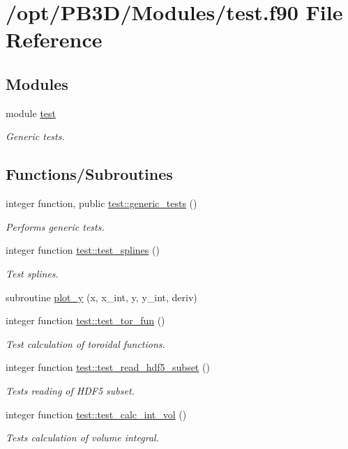 \hypertarget{test_8f90}{}\section{/opt/\+P\+B3\+D/\+Modules/test.f90 File Reference}
\label{test_8f90}
\subsection*{Modules}
\begin{DoxyCompactItemize}
\item 
module \hyperlink{namespacetest}{test}
\begin{DoxyCompactList}\small\item\em Generic tests. \end{DoxyCompactList}\end{DoxyCompactItemize}
\subsection*{Functions/\+Subroutines}
\begin{DoxyCompactItemize}
\item 
integer function, public \hyperlink{namespacetest_aca21ee464c0b1f4b617177afdde110ec}{test\+::generic\+\_\+tests} ()
\begin{DoxyCompactList}\small\item\em Performs generic tests. \end{DoxyCompactList}\item 
integer function \hyperlink{namespacetest_a53c6b3d654d4577af301fe3b04473d6a}{test\+::test\+\_\+splines} ()
\begin{DoxyCompactList}\small\item\em Test splines. \end{DoxyCompactList}\item 
subroutine \hyperlink{test_8f90_a197914f99b7e194fb4bca9ca3669e0e8}{plot\+\_\+y} (x, x\+\_\+int, y, y\+\_\+int, deriv)
\item 
integer function \hyperlink{namespacetest_ab595ec935321ea0b1168593fb88fad22}{test\+::test\+\_\+tor\+\_\+fun} ()
\begin{DoxyCompactList}\small\item\em Test calculation of toroidal functions. \end{DoxyCompactList}\item 
integer function \hyperlink{namespacetest_ac574f08ba400cd61070a6a6f13f6f7ee}{test\+::test\+\_\+read\+\_\+hdf5\+\_\+subset} ()
\begin{DoxyCompactList}\small\item\em Tests reading of H\+D\+F5 subset. \end{DoxyCompactList}\item 
integer function \hyperlink{namespacetest_a0d4cb791bf762b2e52260fea7644a3ee}{test\+::test\+\_\+calc\+\_\+int\+\_\+vol} ()
\begin{DoxyCompactList}\small\item\em Tests calculation of volume integral. \end{DoxyCompactList}\end{DoxyCompactItemize}


